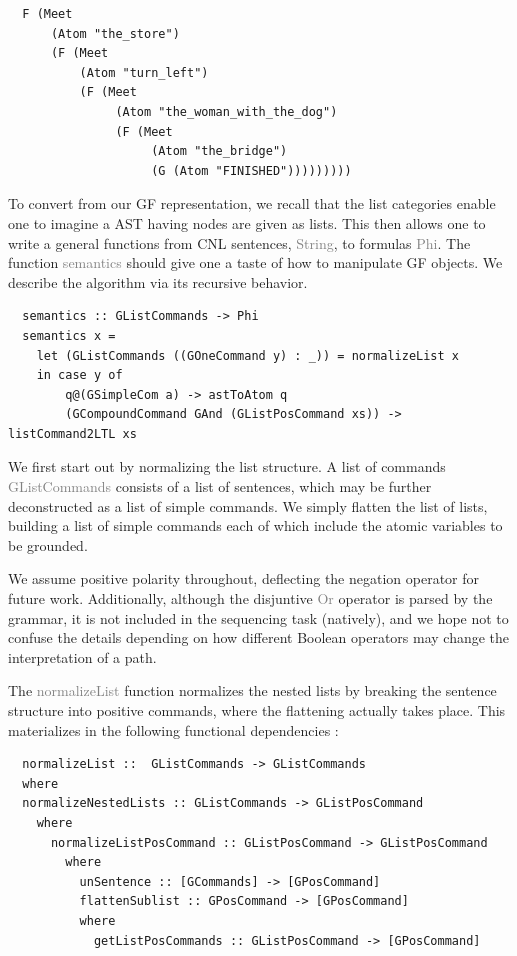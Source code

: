 \documentclass{article}
\newcommand{\gray}[1]{\textcolor{gray}{#1}}
\begin{document}
\begin{verbatim}
  F (Meet
      (Atom "the_store")
      (F (Meet
          (Atom "turn_left")
          (F (Meet
               (Atom "the_woman_with_the_dog")
               (F (Meet
                    (Atom "the_bridge")
                    (G (Atom "FINISHED")))))))))
\end{verbatim}

To convert from our GF representation, we recall that the list categories enable
one to imagine a AST having nodes are given as lists. This then allows one to
write a general functions from CNL sentences, \gray{String}, to formulas
\gray{Phi}. The function \gray{semantics} should give one a taste of how to
manipulate GF objects. We describe the algorithm via its recursive behavior.

\begin{verbatim}
  semantics :: GListCommands -> Phi
  semantics x =
    let (GListCommands ((GOneCommand y) : _)) = normalizeList x
    in case y of
        q@(GSimpleCom a) -> astToAtom q
        (GCompoundCommand GAnd (GListPosCommand xs)) -> listCommand2LTL xs
\end{verbatim}

We first start out by normalizing the list structure. A list of commands
\gray{GListCommands} consists of a list of sentences, which may be further
deconstructed as a list of simple commands. We simply flatten the list of lists,
building a list of simple commands each of which include the atomic variables to
be grounded.

We assume positive polarity throughout, deflecting the negation operator for
future work. Additionally, although the disjuntive \gray{Or} operator is parsed
by the grammar, it is not included in the sequencing task (natively), and we
hope not to confuse the details depending on how different Boolean operators may
change the interpretation of a path.

The \gray{normalizeList} function normalizes the nested lists by breaking the sentence
structure into positive commands, where the flattening actually takes place.
This materializes in the following functional dependencies :

\begin{verbatim}
  normalizeList ::  GListCommands -> GListCommands
  where
  normalizeNestedLists :: GListCommands -> GListPosCommand
    where
      normalizeListPosCommand :: GListPosCommand -> GListPosCommand
        where
          unSentence :: [GCommands] -> [GPosCommand]
          flattenSublist :: GPosCommand -> [GPosCommand]
          where
            getListPosCommands :: GListPosCommand -> [GPosCommand]
\end{verbatim}
\end{document}
